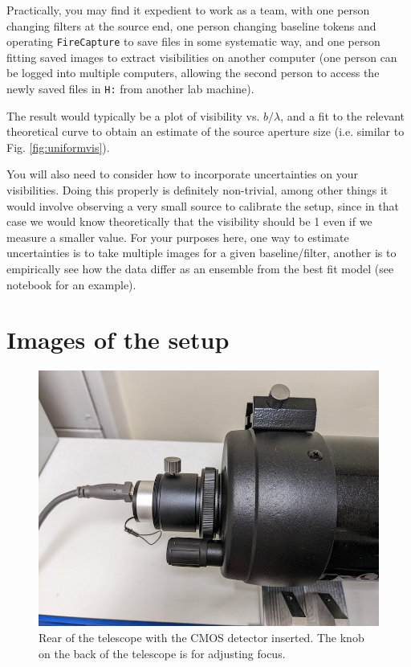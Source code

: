 \documentclass[11pt]{article}
\begin{document}
Practically, you may find it expedient to work as a team, with one person changing filters at the source end, one person changing baseline tokens and operating \texttt{FireCapture} to save files in some systematic way, and one person fitting saved images to extract visibilities on another computer (one person can be logged into multiple computers, allowing the second person to access the newly saved files in \texttt{H:} from another lab machine).

The result would typically be a plot of visibility vs. $b/\lambda$, and a fit to the relevant theoretical curve to obtain an estimate of the source aperture size (i.e. similar to Fig. \ref{fig:uniformvis}).

You will also need to consider how to incorporate uncertainties on your visibilities. Doing this properly is definitely non-trivial, among other things it would involve observing a very small source to calibrate the setup, since in that case we would know theoretically that the visibility should be 1 even if we measure a smaller value. For your purposes here, one way to estimate uncertainties is to take multiple images for a given baseline/filter, another is to empirically see how the data differ as an ensemble from the best fit model (see notebook for an example).

\clearpage
\appendix

\section{Images of the setup}

\begin{figure}[h]
    \centering
    \includegraphics[width=1\textwidth]{doc/tel.png}
    \caption{Rear of the telescope with the CMOS detector inserted. The knob on the back of the telescope is for adjusting focus.}
    \label{fig:tel}
\end{figure}
\end{document}
